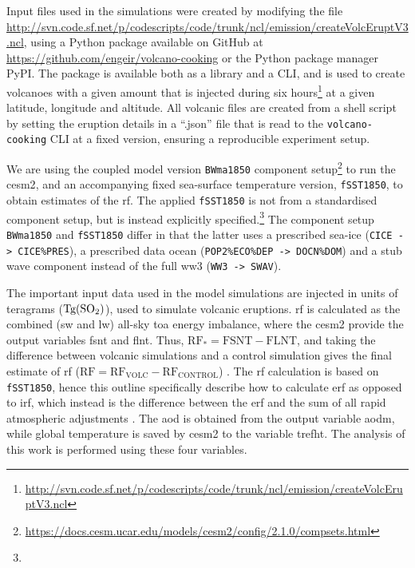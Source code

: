 \documentclass{ametsocV6.1}
\newcommand{\iso}[1][i]{{#1}njected \ce{SO2}}
\begin{document}


\appendix

\appendix[A]


Input files used in the simulations were created by modifying the file
\url{http://svn.code.sf.net/p/codescripts/code/trunk/ncl/emission/createVolcEruptV3.ncl},
using a Python package available on GitHub at
\url{https://github.com/engeir/volcano-cooking} or the Python package manager PyPI\@.
The package is available both as a library and a CLI, and is used to create volcanoes
with a given  amount that is injected during six
hours\footnote{\url{http://svn.code.sf.net/p/codescripts/code/trunk/ncl/emission/createVolcEruptV3.ncl}}
at a given latitude, longitude and altitude. All volcanic  files are created
from a shell script by setting the eruption details in a ``.json'' file that is read to
the \texttt{volcano-cooking} CLI at a fixed version, ensuring a reproducible experiment
setup.

We are using the coupled model version \texttt{BWma1850} component
setup\footnote{\url{https://docs.cesm.ucar.edu/models/cesm2/config/2.1.0/compsets.html}}
to run the \gls{cesm2}, and an accompanying fixed sea-surface temperature version,
\texttt{fSST1850}, to obtain estimates of the \gls{rf}. The applied \texttt{fSST1850} is
not from a standardised component setup, but is instead explicitly
specified.\footnote{\fssturl} The component setup \texttt{BWma1850} and
\texttt{fSST1850} differ in that the latter uses a prescribed sea-ice (\texttt{CICE ->
CICE\%PRES}), a prescribed data ocean (\texttt{POP2\%ECO\%DEP -> DOCN\%DOM}) and a stub
wave component instead of the full \gls{ww3} (\texttt{WW3 -> SWAV}).

The important input data used in the model simulations are \iso{} in units of teragrams
(\(\si{\tera\gram(\ce{SO2})}\)), used to simulate volcanic eruptions. \gls{rf} is
calculated as the combined (\gls{sw} and \gls{lw}) all-sky \gls{toa} energy imbalance,
where the \gls{cesm2} provide the output variables \gls{fsnt} and \gls{flnt}. Thus,
\(\mathrm{RF_*}= \mathrm{FSNT} - \mathrm{FLNT}\), and taking the difference between
volcanic simulations and a control simulation gives the final estimate of \gls{rf}
(\(\mathrm{RF}=\mathrm{RF_{VOLC}}-\mathrm{RF_{CONTROL}}\)) \citep{marshall2020}. The
\gls{rf} calculation is based on \texttt{fSST1850}, hence this outline specifically
describe how to calculate \gls{erf} as opposed to \gls{irf}, which instead is the
difference between the \gls{erf} and the sum of all rapid atmospheric adjustments
\citep{marshall2020,smith2018}. The \gls{aod} is obtained from the output variable
\gls{aodm}, while global temperature is saved by \gls{cesm2} to the variable
\gls{trefht}. The analysis of this work is performed using these four variables. 
\end{document}
